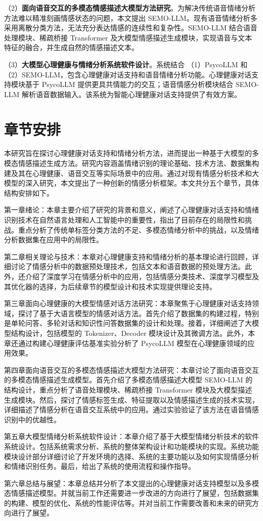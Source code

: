 （2）\textbf{面向语音交互的多模态情感描述大模型方法研究}。为解决传统语音情绪分析方法难以精准刻画情感状态的问题，本文提出 SEMO-LLM。现有语音情绪分析多采用离散分类方法，无法充分表达情感的连续性和复杂性。SEMO-LLM 结合语音处理模块、稀疏桥接 Transformer 及大模型情感描述生成模块，实现语音与文本特征的融合，并生成自然的情感描述文本。

（3）\textbf{大模型心理健康与情绪分析系统软件设计}。系统结合 （1）PsycoLLM 和 （2）SEMO-LLM，包含心理健康对话支持和语音情绪分析功能。心理健康对话支持模块基于 PsycoLLM 提供更具共情能力的交互；语音情感分析模块结合 SEMO-LLM 解析语音数据输入。该系统为智能心理健康对话支持提供了有效方案。

\section{章节安排}

本研究旨在探讨心理健康对话支持和情绪分析方法，进而提出一种基于大模型的多模态情感描述生成方法。研究内容涵盖情绪识别的理论基础、技术方法、数据集构建及其在心理健康、语音交互等实际场景中的应用。通过对现有情感分析技术和大模型的深入研究，本文提出了一种创新的情感分析框架。本文共分五个章节，具体结构安排如下。

第一章绪论：本章主要介绍了研究的背景和意义，阐述了心理健康对话支持和情绪识别技术在自然语言处理和人工智能中的重要性，指出了目前存在的局限性和挑战。重点分析了传统单标签分类方法的不足、多模态情绪分析中的挑战，以及情绪分析数据集在应用中的局限性。

第二章相关理论与技术：本章对心理健康支持和情绪分析的基本理论进行回顾，详细讨论了情感分析中的数据预处理技术，包括文本和语音数据的预处理方法。此外，还介绍了深度学习在情感分析中的应用，包括情感分类技术、深度学习模型及其优化器的选择，为后续章节的模型设计和技术实现提供理论支持。

第三章面向心理健康的大模型情感对话方法研究：本章聚焦于心理健康对话支持领域，探讨了基于大语言模型的情感对话方法。首先介绍了数据集的构建过程，特别是单轮问答、多轮对话和知识性问答数据集的设计和处理。接着，详细阐述了大模型结构设计，包括模型的 Tokenizer、Decoder 模块设计及其微调方法。此外，本章还通过构建心理健康评估基准实验分析了 PsycoLLM 模型在心理健康领域的应用效果。

第四章面向语音交互的多模态情感描述大模型方法研究：本章讨论了面向语音交互的多模态情感描述生成模型。首先介绍了多模态情感描述大模型 SEMO-LLM 的结构设计，重点分析了语音处理模块、稀疏桥接 Transformer 模块及大模型描述生成模块。然后，探讨了情感标签生成、特征提取以及情感描述生成的技术实现，详细描述了情感分析在语音交互系统中的应用。通过实验验证了该方法在语音情感识别中的优越性。

第五章大模型情绪分析系统软件设计：本章介绍了基于大模型情绪分析技术的软件系统设计。包括系统需求分析、系统的整体架构设计和功能模块的实现。系统功能模块设计部分详细讨论了开发环境的选择、系统的主要功能以及如何实现情感分析和情绪识别任务。最后，给出了系统的使用流程和操作指导。

第六章总结与展望：本章总结并分析了本文提出的心理健康对话支持模型以及多模态情感描述模型。并就当前工作还需要进一步改进的方向进行了展望，包括数据集的构建、模型的优化、系统的性能评估等。并对当前工作需要改善和未来的研究方向进行了展望。